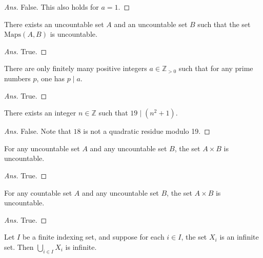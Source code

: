 \documentclass[12pt]{article}
\newenvironment{problem}[2][Problem]{\begin{trivlist}
\item[\hskip \labelsep {\bfseries #1}\hskip \labelsep {\bfseries #2.}]}{\end{trivlist}}
\begin{document}
\begin{proof}[Ans]
False. This also holds for $a = 1$.
\end{proof}

\begin{problem}{47}
There exists an uncountable set $A$ and an uncountable set $B$ such that the set $\text{Maps}(A, B)$ is uncountable.
\end{problem}

\begin{proof}[Ans]
True.
\end{proof}

\begin{problem}{48}
There are only finitely many positive integers $a \in \mathbb{Z}_{>0}$ such that for any prime numbers $p$, one has $p \mid a$.
\end{problem}

\begin{proof}[Ans]
True.
\end{proof}

\begin{problem}{49}
There exists an integer $n \in \mathbb{Z}$ such that $19 \mid (n^2 + 1)$.
\end{problem}

\begin{proof}[Ans]
False. Note that $18$ is not a quadratic residue modulo 19.
\end{proof}

\begin{problem}{50}
For any uncountable set $A$ and any uncountable set $B$, the set $A \times B$ is uncountable.
\end{problem}

\begin{proof}[Ans]
True.
\end{proof}

\begin{problem}{51}
For any countable set $A$ and any uncountable set $B$, the set $A\times B$ is uncountable.
\end{problem}

\begin{proof}[Ans]
True.
\end{proof}

\begin{problem}{52}
Let $I$ be a finite indexing set, and suppose for each $i \in I$, the set $X_i$ is an infinite set. Then $\bigcup_{i \in I} X_i$ is infinite.
\end{problem}
\end{document}
